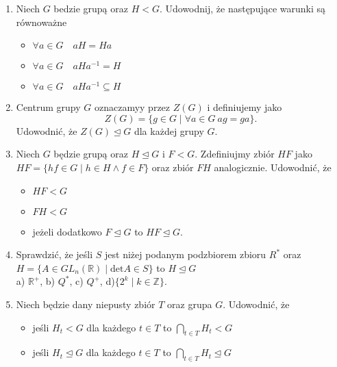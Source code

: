 \documentclass{article}
\begin{document}
\begin{enumerate}[resume]
    \item Niech $G$ bedzie grupą oraz $H < G$. Udowodnij, że następujące warunki są równoważne 
        \begin{itemize}
            \item $\forall a \in G \quad aH = Ha$ 
            \item $\forall a \in G \quad aHa^{-1} = H$
            \item $\forall a \in G \quad aHa^{-1} \subseteq H$
        \end{itemize}
    \item Centrum grupy $G$ oznaczamyy przez $Z(G)$ i definiujemy jako
        $$Z(G) = \{ g\in G \mid \forall a \in G \ ag = ga\}.$$
        Udowodnić, że $Z(G) \trianglelefteq G$ dla każdej grupy $G$.
    \item Niech $G$ będzie grupą oraz $H \trianglelefteq G$ i $F < G$. Zdefiniujmy zbiór $HF$ jako $HF = \{ hf \in G \mid h \in H \land f \in F\}$ oraz zbiór $FH$ analogicznie. Udowodnić, że
        \begin{itemize}
            \item $HF < G$
            \item $FH < G$
            \item jeżeli dodatkowo $F \trianglelefteq G$ to $HF \trianglelefteq G$.
        \end{itemize}
    \item Sprawdzić, że jeśli $S$ jest niżej podanym podzbiorem zbioru $R^*$ oraz  \\  $H = \{ A \in GL_n(\mathbb{R}) \mid \text{det}A \in S\}$ to $H \trianglelefteq G$ \\ 
        a) $\mathbb{R}^+$, \quad b) $Q^*$, \quad c) $Q^{+}$, \quad d)$\{ 2^k \mid k \in \mathbb{Z} \}$.
    \item Niech będzie dany niepusty zbiór $T$ oraz grupa $G$. Udowodnić, że 
        \begin{itemize}
            \item jeśli $H_t < G$ dla każdego $t \in T$ to $\bigcap_{t \in T}H_t < G$
            \item jeśli $H_t \trianglelefteq G$ dla każdego $t \in T$ to $\bigcap_{t \in T}H_t \trianglelefteq G$
        \end{itemize}
\end{enumerate}
\end{document}

